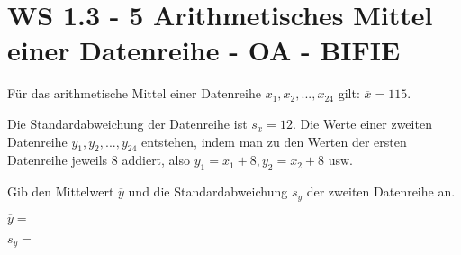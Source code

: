 \section{WS 1.3 - 5 Arithmetisches Mittel einer Datenreihe - OA - BIFIE}

\begin{beispiel}[WS 1.3]{1} %
				Für das arithmetische Mittel einer Datenreihe $x_{1},x_{2},...,x_{24}$ gilt: $\overline{x}=115$.

Die Standardabweichung der Datenreihe ist $s_{x}=12$. Die Werte einer zweiten Datenreihe $y_{1},y_{2},...,y_{24}$ entstehen, indem man zu den Werten der ersten Datenreihe jeweils 8 addiert, also $y_{1}=x_{1}+8,y_{2}=x_{2}+8$ usw.

Gib den Mittelwert $\overline{y}$ und die Standardabweichung $s_{y}$ der zweiten Datenreihe an.

$\overline{y}=$

$s_{y}=$


				\end{beispiel}